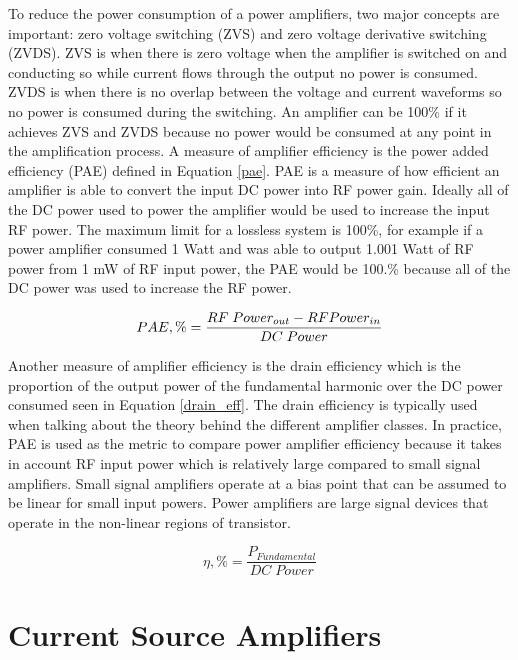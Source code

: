 To reduce the power consumption of a power amplifiers, two major concepts are important: zero voltage switching (ZVS) and zero voltage derivative switching (ZVDS). ZVS is when there is zero voltage when the amplifier is switched on and conducting so while current flows through the output no power is consumed. ZVDS is when there is no overlap between the voltage and current waveforms so no power is consumed during the switching. An amplifier can be 100\% if it achieves ZVS and ZVDS because no power would be consumed at any point in the amplification process. A measure of amplifier efficiency is the power added efficiency (PAE) defined in Equation \ref{pae}. PAE is a measure of how efficient an amplifier is able to convert the input DC power into RF power gain. Ideally all of the DC power used to power the amplifier would be used to increase the input RF power. The maximum limit for a lossless system is 100\%, for example if a power amplifier consumed 1 Watt and was able to output 1.001 Watt of RF power from 1 mW of RF input power, the PAE would be 100.\% because all of the DC power was used to increase the RF power.

\begin{equation}\label{pae}
  PAE,\% = \frac{RF\;Power_{out} - RF\\Power_{in}}{DC\;Power}
\end{equation}

Another measure of amplifier efficiency is the drain efficiency which is the proportion of the output power of the fundamental harmonic over the DC power consumed seen in Equation \ref{drain_eff}. The drain efficiency is typically used when talking about the theory behind the different amplifier classes. In practice, PAE is used as the metric to compare power amplifier efficiency because it takes in account RF input power which is relatively large compared to small signal amplifiers. Small signal amplifiers operate at a bias point that can be assumed to be linear for small input powers. Power amplifiers are large signal devices that operate in the non-linear regions of transistor.

\begin{equation}\label{drain_eff}
  \eta, \% = \frac{P_{Fundamental}}{DC\;Power}
\end{equation}

\section{Current Source Amplifiers}

